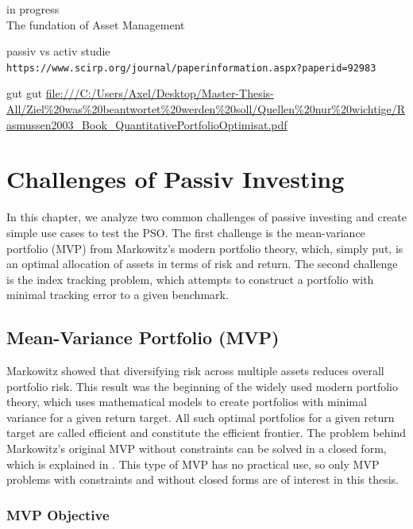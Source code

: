 \documentclass[
  oneside]{book}
\begin{document}
\textbar\textbar\textbar in progress\textbar\textbar\textbar{}\\
The fundation of Asset Management

passiv vs activ studie
\texttt{https://www.scirp.org/journal/paperinformation.aspx?paperid=92983}

gut gut
\url{file:///C:/Users/Axel/Desktop/Master-Thesis-All/Ziel\%20was\%20beantwortet\%20werden\%20soll/Quellen\%20nur\%20wichtige/Rasmussen2003_Book_QuantitativePortfolioOptimisat.pdf}

\hypertarget{challenges}{%
\chapter{Challenges of Passiv Investing}\label{challenges}}

In this chapter, we analyze two common challenges of passive investing and create simple use cases to test the PSO. The first challenge is the mean-variance portfolio (MVP) from Markowitz's modern portfolio theory, which, simply put, is an optimal allocation of assets in terms of risk and return. The second challenge is the index tracking problem, which attempts to construct a portfolio with minimal tracking error to a given benchmark.

\hypertarget{mean-variance-portfolio-mvp}{%
\section{Mean-Variance Portfolio (MVP)}\label{mean-variance-portfolio-mvp}}

Markowitz showed that diversifying risk across multiple assets reduces overall portfolio risk. This result was the beginning of the widely used modern portfolio theory, which uses mathematical models to create portfolios with minimal variance for a given return target. All such optimal portfolios for a given return target are called efficient and constitute the efficient frontier. The problem behind Markowitz's original MVP without constraints can be solved in a closed form, which is explained in \citep{Eric2021}. This type of MVP has no practical use, so only MVP problems with constraints and without closed forms are of interest in this thesis.

\hypertarget{mvp-objective}{%
\subsection{MVP Objective}\label{mvp-objective}}
\end{document}
